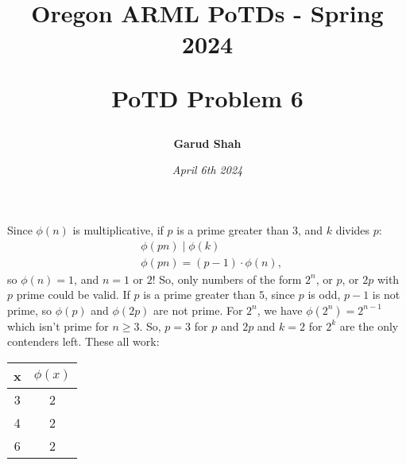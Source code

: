 \documentclass{article}
\title{\begin{center}
    Oregon ARML PoTDs - Spring 2024
\end{center}
\begin{center}
    \textbf{PoTD Problem 6}
\end{center}}
\author{\textbf{Garud Shah}}
\date{\textit{April 6th 2024}}
\begin{document}
Since $\phi(n)$ is multiplicative, if $p$ is a prime greater than 3, and $k$ divides $p$:
\begin{align}
    & \phi(pn) \mid \phi(k)  \\
    & \phi(pn) = (p - 1) \cdot \phi(n),
\end{align}
so $\phi(n) = 1$, and $n = 1$ or $2$! So, only numbers of the form $2^n$, or $p$, or $2p$ with $p$ prime could be valid. 
If $p$ is a prime greater than $5$,
since $p$ is odd, $p-1$ is not prime, so $\phi(p)$ and $\phi(2p)$ are not prime. For $2^n$, we have $\phi(2^n) = 2^{n-1}$ which isn't prime
for $n \ge 3$. So, $p = 3$ for $p$ and $2p$ and $k = 2$ for $2^k$ are the only contenders left. \newline
These all work:
\begin{center}
\begin{tabular}{|c|c|}
    \hline
    x & $\phi(x)$ \\
    \hline
    3 & 2 \\
    4 & 2 \\
    6 & 2 \\
    \hline
\end{tabular}
\end{center}
\end{document}
